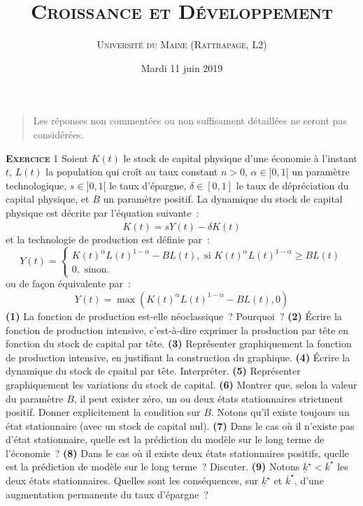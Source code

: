 \documentclass[10pt,a4paper,notitlepage]{article}
\newcommand{\exercice}[1]{\textsc{\textbf{Exercice}} #1}
\newcommand{\question}[1]{\textbf{(#1)}}
\begin{document}
\title{\textsc{Croissance et Développement}}
\author{\textsc{Université du Maine (Rattrapage, L2)}}
\date{Mardi 11 juin 2019}


\maketitle
\thispagestyle{empty}


\begin{quote}
  Les réponses non commentées ou non suffisament détaillées ne seront
  pas considérées.
\end{quote}

\bigskip
\bigskip

\exercice{1} Soient $K(t)$ le stock de capital physique d'une économie
à l'instant $t$, $L(t)$ la population qui croît au taux constant
$n>0$, $\alpha\in]0,1[$ un paramètre technologique, $s\in]0,1[$ le
taux d'épargne, $\delta\in[0,1]$ le taux de dépréciation du capital
physique, et $B$ un paramètre positif. La dynamique du stock de
capital physique est décrite par l'équation suivante :
\[
\dot K(t) = sY(t)-\delta K(t)
\]
et la technologie de production est définie par :
\[
  Y(t) = 
  \begin{cases}
    K(t)^\alpha L(t)^{1-\alpha} - BL(t), \text{ si }K(t)^\alpha L(t)^{1-\alpha} \geq BL(t)\\
    0, \text{ sinon.}
  \end{cases}
\]
ou de façon équivalente par :
\[
Y(t) = \max \left(K(t)^\alpha L(t)^{1-\alpha} - BL(t), 0\right)
\]
\question{1} La fonction de production est-elle néoclassique ?
Pourquoi ? \question{2} Écrire la fonction de production intensive,
c'est-à-dire exprimer la production par tête en fonction du stock de
capital par tête. \question{3} Représenter graphiquement la fonction
de production intensive, en justifiant la construction du
graphique. \question{4} Écrire la dynamique du stock de cpaital par
tête. Interpréter. \question{5} Représenter graphiquement les
variations du stock de capital. \question{6} Montrer que, selon la
valeur du paramètre $B$, il peut exister zéro, un ou deux états
stationnaires strictment positif. Donner explicitement la condition
sur $B$. Notons qu'il existe toujours un état stationnaire (avec un
stock de capital nul). \question{7} Dans le cas où il n'existe pas
d'état stationnaire, quelle est la prédiction du modèle sur le long
terme de l'économie ? \question{8} Dans le cas où il existe deux états
stationnaires positifs, quelle est la prédiction de modèle sur le long
terme ? Discuter. \question{9} Notons
$\underline{k}^{\star}<\overline{k}^{\star}$ les deux états
stationnaires. Quelles sont les conséquences, sur
$\underline{k}^{\star}$ et $\overline{k}^{\star}$, d'une augmentation
permanente du taux d'épargne ?\newline
\end{document}
